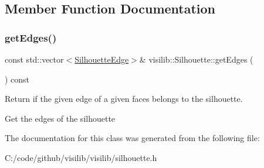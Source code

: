 \subsection{Member Function Documentation}
\mbox{\label{classvisilib_1_1_silhouette_a71ef8585c5f017de2a5af97d870b12c7}} 
\subsubsection{\texorpdfstring{getEdges()}{getEdges()}}
{\footnotesize\ttfamily const std\+::vector$<$\mbox{\hyperlink{structvisilib_1_1_silhouette_edge}{Silhouette\+Edge}}$>$\& visilib\+::\+Silhouette\+::get\+Edges (\begin{DoxyParamCaption}{ }\end{DoxyParamCaption}) const\hspace{0.3cm}{\ttfamily [inline]}}



Return if the given edge of a given faces belongs to the silhouette. 

Get the edges of the silhouette 

The documentation for this class was generated from the following file\+:\begin{DoxyCompactItemize}
\item 
C\+:/code/github/visilib/visilib/silhouette.\+h\end{DoxyCompactItemize}
